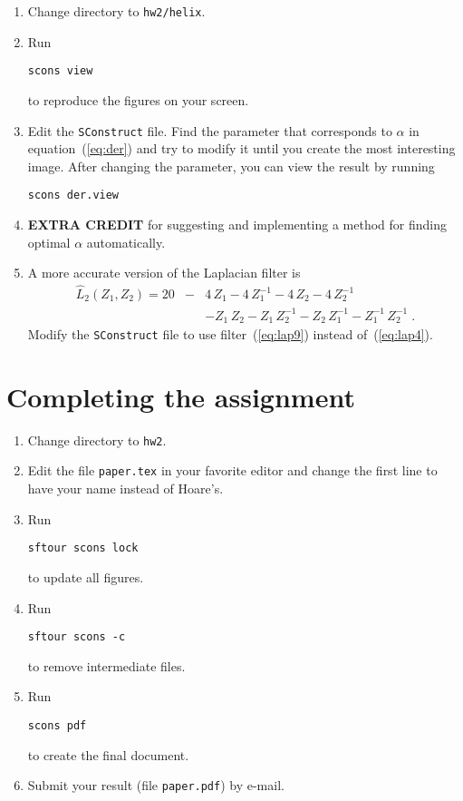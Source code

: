 \begin{enumerate}
\item Change directory to \texttt{hw2/helix}.
\item Run 
\begin{verbatim}
scons view
\end{verbatim}
to reproduce the figures on your screen.
\item Edit the \texttt{SConstruct} file. Find the parameter that corresponds to $\alpha$ in equation~(\ref{eq:der}) and try to modify it until you create the most interesting image. After changing the parameter, you can view the result by running
\begin{verbatim}
scons der.view
\end{verbatim}
\item \textbf{EXTRA CREDIT} for suggesting and implementing a method for finding optimal $\alpha$ automatically.
\item A more accurate version of the Laplacian filter is
\begin{eqnarray}
\nonumber
\hat{L}_2(Z_1,Z_2) = 20 & - & 4\,Z_1 - 4\,Z_1^{-1} - 4\,Z_2 - 4\,Z_2^{-1} \\
&  & - Z_1\,Z_2 - Z_1\,Z_2^{-1} - Z_2\,Z_1^{-1} - Z_1^{-1}\,Z_2^{-1}\;.
\label{eq:lap9}
\end{eqnarray}
Modify the \texttt{SConstruct} file to use filter~(\ref{eq:lap9}) instead of~(\ref{eq:lap4}).
\end{enumerate}

\lstset{language=python,numbers=left,numberstyle=\tiny,showstringspaces=false}


\newpage

\section{Completing the assignment}

\begin{enumerate}
\item Change directory to \texttt{hw2}.
\item Edit the file \texttt{paper.tex} in your favorite editor and change the
  first line to have your name instead of Hoare's.
\item Run
\begin{verbatim}
sftour scons lock
\end{verbatim}
to update all figures.
\item Run
\begin{verbatim}
sftour scons -c
\end{verbatim}
to remove intermediate files.
\item Run
\begin{verbatim}
scons pdf
\end{verbatim}
to create the final document.
\item Submit your result (file \texttt{paper.pdf}) by e-mail.
\end{enumerate}
